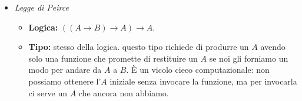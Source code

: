 \documentclass[a4paper,11pt]{report}
\begin{document}
\begin{itemize}
    \item \textit{Legge di Peirce}
    \begin{itemize}
        \item \textbf{Logica:} $((A \to B) \to A) \to A$.
        \item \textbf{Tipo:} stesso della logica.
        \subitem questo tipo richiede di produrre un $A$ avendo solo una funzione che promette di restituire un $A$ se noi gli forniamo un modo per andare da $A$ a $B$. È un vicolo cieco computazionale: non possiamo ottenere l'$A$ iniziale senza invocare la funzione, ma per invocarla ci serve un $A$ che ancora non abbiamo.
    \end{itemize}
\end{itemize}
\end{document}
